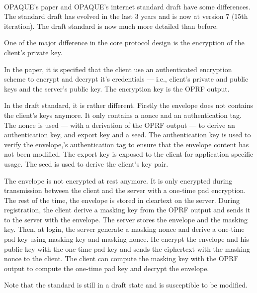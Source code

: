 \documentclass[../report.tex]{subfiles}
\begin{document}
\paragraph{} \label{sec:opaque_paper_vs_draft}
OPAQUE's paper \cite{OPAQUE_Paper} and OPAQUE's internet standard draft \cite{OPAQUE_Standard_Draft} have some differences. The standard draft has evolved in the last 3 years and is now at version 7 (15th iteration).
The draft standard is now much more detailed than before.


One of the major difference in the core protocol design is the encryption of the client's private key.

In the paper, it is specified that the client use an authenticated encryption scheme to encrypt and decrypt it's credentials --- i.e., client's private and public keys and the server's public key. The encryption key is the OPRF output.

In the draft standard, it is rather different.
Firstly the envelope does not contains the client's keys anymore. It only contains a nonce and an authentication tag. 
The nonce is used --- with a derivation of the OPRF output --- to derive an authentication key, and export key and a seed.
The authentication key is used to verify the envelope,'s authentication tag to ensure that the envelope content has not been modified.
The export key is exposed to the client for application specific usage.
The seed is used to derive the client's key pair.


The envelope is not encrypted at rest anymore. It is only encrypted during transmission between the client and the server with a one-time pad encryption. The rest of the time, the envelope is stored in cleartext on the server.
During registration, the client derive a masking key from the OPRF output and sends it to the server with the envelope. The server stores the envelope and the masking key.
Then, at login, the server generate a masking nonce and derive a one-time pad key using masking key and masking nonce. He encrypt the envelope and his public key with the one-time pad key and sends the ciphertext with the masking nonce to the client.
The client can compute the masking key with the OPRF output to compute the one-time pad key and decrypt the envelope.




Note that the standard is still in a draft state and is susceptible to be modified.
\end{document}
